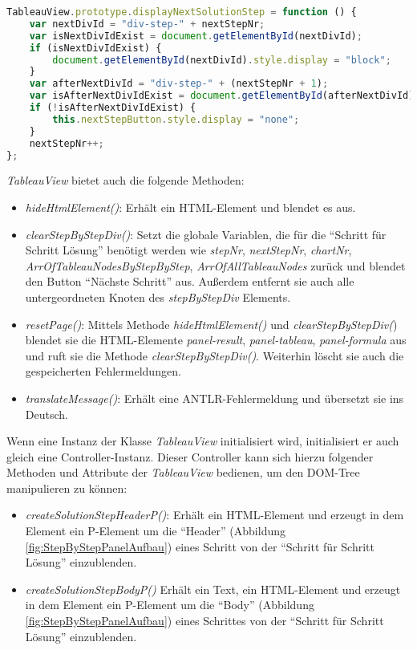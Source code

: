 \begin{itemize}
\begin{lstlisting}[language=JavaScript, caption= displayNextSolutionStep(Klasse TableauView), basicstyle=\scriptsize]
TableauView.prototype.displayNextSolutionStep = function () {
    var nextDivId = "div-step-" + nextStepNr;
    var isNextDivIdExist = document.getElementById(nextDivId);
    if (isNextDivIdExist) {
        document.getElementById(nextDivId).style.display = "block";
    }
    var afterNextDivId = "div-step-" + (nextStepNr + 1);
    var isAfterNextDivIdExist = document.getElementById(afterNextDivId);
    if (!isAfterNextDivIdExist) {
        this.nextStepButton.style.display = "none";
    }
    nextStepNr++;
};
\end{lstlisting}
\end{itemize}

\textit{TableauView} bietet auch die folgende Methoden:
\begin{itemize}
\item	\textit{hideHtmlElement()}: Erhält ein HTML-Element und blendet es aus.
\item	\textit{clearStepByStepDiv()}: Setzt die globale Variablen, die für die ``Schritt für Schritt Lösung''  benötigt werden wie \textit{stepNr}, \textit{nextStepNr}, \textit{chartNr},\textit{ ArrOfTableauNodesByStepByStep}, \textit{ArrOfAllTableauNodes} zurück und blendet den Button ``Nächste Schritt'' aus. Außerdem entfernt sie auch alle untergeordneten Knoten des  \textit{stepByStepDiv} Elements.   
\item	\textit{resetPage()}: Mittels Methode \textit{hideHtmlElement()} und \textit{clearStepByStepDiv(}) blendet sie die HTML-Elemente \textit{panel-result}, \textit{panel-tableau}, \textit{panel-formula} aus und ruft sie die Methode \textit{clearStepByStepDiv()}. Weiterhin löscht sie auch die gespeicherten Fehlermeldungen.
\item	\textit{translateMessage()}: Erhält eine ANTLR-Fehlermeldung und übersetzt sie ins Deutsch.
\end{itemize}


Wenn eine Instanz der Klasse \textit{TableauView} initialisiert wird, initialisiert er auch gleich eine Controller-Instanz. Dieser Controller kann sich hierzu folgender Methoden und Attribute der \textit{TableauView} bedienen, um den DOM-Tree manipulieren zu können:
\begin{itemize}
\item	\textit{createSolutionStepHeaderP()}: Erhält ein HTML-Element und erzeugt in dem Element ein P-Element um die ``Header'' (Abbildung \ref{fig:StepByStepPanelAufbau}) eines Schritt von der ``Schritt für Schritt Lösung'' einzublenden.
\item	\textit{createSolutionStepBodyP()}  Erhält ein Text, ein HTML-Element und erzeugt in dem Element ein P-Element um die ``Body'' (Abbildung \ref{fig:StepByStepPanelAufbau}) eines Schrittes von der ``Schritt für Schritt Lösung'' einzublenden.		
\end{itemize}

